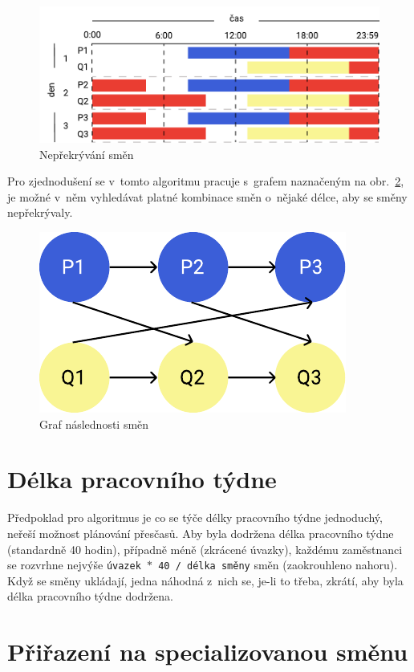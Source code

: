 \documentclass[twoside]{ctuthesis}
\begin{document}
\begin{figure}[h!]
	\includegraphics[scale=0.7]{img/shift-overlap.pdf}
	\caption{Nepřekrývání směn}
	\label{fig:shiftprecedencefull}
\end{figure}

Pro zjednodušení se v~tomto algoritmu pracuje s~grafem naznačeným na obr.~\ref{fig:shiftprecedence}, je možné v~něm vyhledávat platné kombinace směn o~nějaké délce, aby se směny nepřekrývaly.

\begin{figure}[h!]
	\includegraphics[scale=0.7]{img/shift-overlap-small.pdf}
	\caption{Graf následnosti směn}
	\label{fig:shiftprecedence}
\end{figure}


\section{Délka pracovního týdne}
Předpoklad pro algoritmus je co se týče délky pracovního týdne jednoduchý, neřeší možnost plánování přesčasů. Aby byla dodržena délka pracovního týdne (standardně 40 hodin), případně méně (zkrácené úvazky), každému zaměstnanci se rozvrhne nejvýše \texttt{úvazek $\ast$ 40 / délka směny} směn (zaokrouhleno nahoru). Když se směny ukládají, jedna náhodná z~nich se, je-li to třeba, zkrátí, aby byla délka pracovního týdne dodržena.

\section{Přiřazení na specializovanou směnu}
\end{document}

